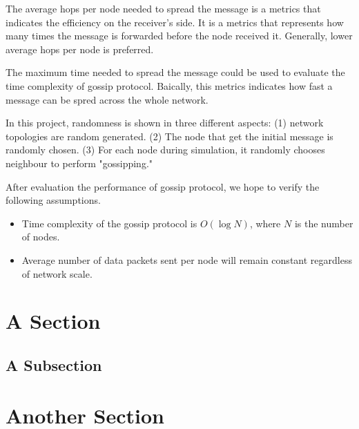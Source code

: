 The average hops per node needed to spread the message is a metrics that indicates the efficiency on the receiver's side. It is a metrics that represents how many times the message is forwarded before the node received it. Generally, lower average hops per node is preferred. 

The maximum time needed to spread the message could be used to evaluate the time complexity of gossip protocol. Baically, this metrics indicates how fast a message can be spred across the whole network.  

In this project, randomness is shown in three different aspects: (1) network topologies are random generated. (2) The node that get the initial message is randomly chosen. (3) For each node during simulation, it randomly chooses neighbour to perform "gossipping." 

After evaluation the performance of gossip protocol, we hope to verify the following assumptions.
\begin{itemize}
	\item Time complexity of the gossip protocol is $O(\log N)$, where $N$ is the number of nodes.
	\item Average number of data packets sent per node will remain constant regardless of network scale.
\end{itemize}


\section{A Section}



\subsection{A Subsection}



\section{Another Section}
